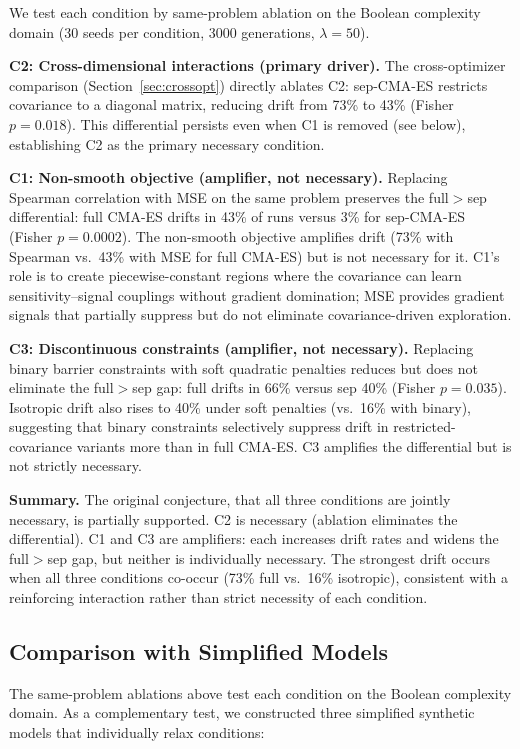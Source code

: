 \documentclass[twoside,11pt]{article}
\begin{document}
We test each condition by same-problem ablation on the Boolean complexity
domain (30 seeds per condition, 3000 generations, $\lambda = 50$).

\textbf{C2: Cross-dimensional interactions (primary driver).}
The cross-optimizer comparison (Section~\ref{sec:crossopt}) directly ablates
C2: sep-CMA-ES restricts covariance to a diagonal matrix, reducing drift
from 73\% to 43\% (Fisher $p = 0.018$). This differential persists even
when C1 is removed (see below), establishing C2 as the primary necessary
condition.

\textbf{C1: Non-smooth objective (amplifier, not necessary).}
Replacing Spearman correlation with MSE on the same problem preserves the
full$>$sep differential: full CMA-ES drifts in 43\% of runs versus 3\% for
sep-CMA-ES (Fisher $p = 0.0002$). The non-smooth objective amplifies drift
(73\% with Spearman vs.\ 43\% with MSE for full CMA-ES) but is not necessary
for it. C1's role is to create piecewise-constant regions where the covariance
can learn sensitivity--signal couplings without gradient domination; MSE
provides gradient signals that partially suppress but do not eliminate
covariance-driven exploration.

\textbf{C3: Discontinuous constraints (amplifier, not necessary).}
Replacing binary barrier constraints with soft quadratic penalties reduces
but does not eliminate the full$>$sep gap: full drifts in 66\% versus sep 40\%
(Fisher $p = 0.035$). Isotropic drift also rises to 40\% under soft
penalties (vs.\ 16\% with binary), suggesting that binary constraints
selectively suppress drift in restricted-covariance variants more than in
full CMA-ES. C3 amplifies the differential but is not strictly necessary.

\textbf{Summary.} The original conjecture, that all three
conditions are jointly necessary, is partially supported. C2 is
necessary (ablation eliminates the differential). C1 and C3 are amplifiers:
each increases drift rates and widens the full$>$sep gap, but neither is
individually necessary. The strongest drift occurs when all three conditions
co-occur (73\% full vs.\ 16\% isotropic), consistent with a reinforcing
interaction rather than strict necessity of each condition.

\subsection{Comparison with Simplified Models}

The same-problem ablations above test each condition on the Boolean complexity
domain. As a complementary test, we constructed three simplified synthetic
models that individually relax conditions:
\end{document}

